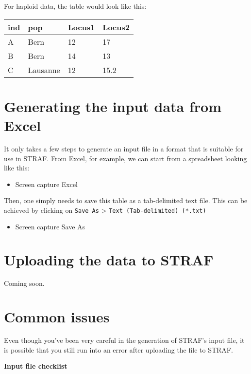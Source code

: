 \documentclass[
  a5paper]{book}
\providecommand{\tightlist}{%
  \setlength{\itemsep}{0pt}\setlength{\parskip}{0pt}}
\begin{document}
For haploid data, the table would look like this:

\begin{longtable}[]{@{}llll@{}}
\toprule
ind & pop & Locus1 & Locus2\tabularnewline
\midrule
\endhead
A & Bern & 12 & 17\tabularnewline
B & Bern & 14 & 13\tabularnewline
C & Lausanne & 12 & 15.2\tabularnewline
\bottomrule
\end{longtable}

\hypertarget{generating-the-input-data-from-excel}{%
\section{Generating the input data from Excel}\label{generating-the-input-data-from-excel}}

It only takes a few steps to generate an input file in a format that is suitable
for use in STRAF. From Excel, for example, we can start from a spreadsheet looking
like this:

\begin{itemize}
\tightlist
\item
  Screen capture Excel
\end{itemize}

Then, one simply needs to save this table as a tab-delimited text file. This can be
achieved by clicking on \texttt{Save\ As} \textgreater{} \texttt{Text\ (Tab-delimited)\ (*.txt)}

\begin{itemize}
\tightlist
\item
  Screen capture Save As
\end{itemize}

\hypertarget{uploading-the-data-to-straf}{%
\section{Uploading the data to STRAF}\label{uploading-the-data-to-straf}}

Coming soon.

\hypertarget{common-issues}{%
\section{Common issues}\label{common-issues}}

Even though you've been very careful in the generation of STRAF's input file,
it is possible that you still run into an error after uploading the file to STRAF.

\textbf{Input file checklist}
\end{document}

